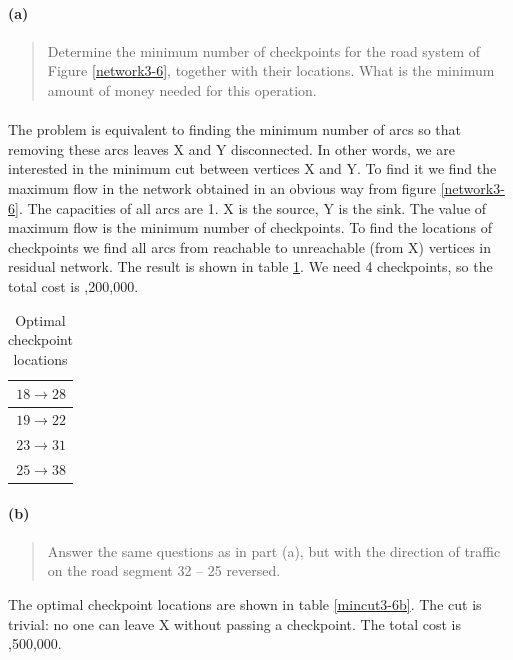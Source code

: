 \paragraph{(a)}
\begin{quote}
Determine the minimum number of checkpoints for the road system of Figure \ref{network3-6}, together with their locations. What is the minimum amount of money needed for this operation.
\end{quote}

\paragraph{}
The problem is equivalent to finding the minimum number of arcs so that removing these arcs leaves X and Y disconnected. In other words, we are interested in the minimum cut between vertices X and Y. To find it we find the maximum flow in the network obtained in an obvious way from figure \ref{network3-6}. The capacities of all arcs are 1. X is the source, Y is the sink. The value of maximum flow is the minimum number of checkpoints. To find the locations of checkpoints we find all arcs from reachable to unreachable (from X) vertices in residual network. The result is shown in table \ref{mincut3-6a}. We need 4 checkpoints, so the total cost is ,200,000.

\begin{table}[H]
\centering
\begin{tabular}{|r|}
\hline
$18 \rightarrow 28$ \\ \hline
$19 \rightarrow 22$ \\ \hline
$23 \rightarrow 31$ \\ \hline
$25 \rightarrow 38$ \\ \hline
\end{tabular}
\caption{Optimal checkpoint locations}
\label{mincut3-6a}
\end{table}

\paragraph{(b)}
\begin{quote}
Answer the same questions as in part (a), but with the direction of traffic on the road segment 32 – 25 reversed.
\end{quote}

The optimal checkpoint locations are shown in table \ref{mincut3-6b}. The cut is trivial: no one can leave X without passing a checkpoint. The total cost is ,500,000.

